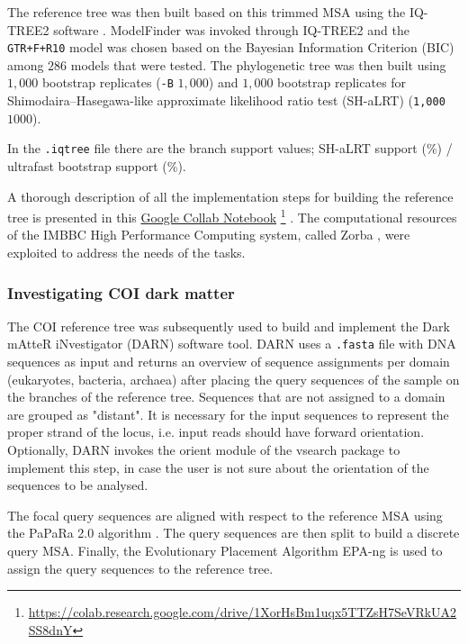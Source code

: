    The reference tree was then built based on this trimmed MSA using the IQ-TREE2 software \citep{hoang2018ufboot2, minh2020iq}.
   ModelFinder was invoked through IQ-TREE2 and the \texttt{GTR+F+R10} model was chosen based on the 
   Bayesian Information Criterion (BIC) among $286$ models that were tested. 
   The phylogenetic tree was then built using $1,000$ bootstrap replicates (\texttt{-B} $1,000$) and 
   $1,000$ bootstrap replicates for Shimodaira–Hasegawa-like approximate likelihood ratio test (SH-aLRT) (\texttt{1,000} $1000$).
   
   In the \texttt{.iqtree} file there are the branch support values; SH-aLRT support (\%) / ultrafast bootstrap support (\%).
   
   A thorough description of all the implementation steps for building the reference tree is presented in this 
   \href{https://colab.research.google.com/drive/1XorHsBm1uqx5TTZsH7SeVRkUA2SS8dnY}{Google Collab Notebook} 
   \footnote{
      \href{https://colab.research.google.com/drive/1XorHsBm1uqx5TTZsH7SeVRkUA2SS8dnY}{https://colab.research.google.com/drive/1XorHsBm1uqx5TTZsH7SeVRkUA2SS8dnY}
   }
   . 
   The computational resources of the IMBBC High Performance Computing system, called Zorba \citep{zafeiropoulos20210s}, were exploited to address the needs of the tasks.


   \subsubsection*{Investigating COI dark matter}
   \label{subsec:darn-methods-investigate}

   The COI reference tree was subsequently used to build and implement the Dark mAtteR iNvestigator (DARN) software tool. 
   DARN uses a \texttt{.fasta} file with DNA sequences as input and returns an overview of sequence assignments per domain (eukaryotes, bacteria, archaea) after placing the query sequences of the sample on the branches of the reference tree. 
   Sequences that are not assigned to a domain are grouped as "distant". 
   It is necessary for the input sequences to represent the proper strand of the locus, 
   i.e. input reads should have forward orientation. 
   Optionally, DARN invokes the orient module of the vsearch package \citep{rognes2016vsearch} to implement this step, in case the user is not sure about the orientation of the sequences to be analysed.

   The focal query sequences are aligned with respect to the reference MSA using the PaPaRa 2.0 algorithm \citep{berger2012papara}. 
   The query sequences are then split to build a discrete query MSA. 
   Finally, the Evolutionary Placement Algorithm EPA-ng \citep{barbera2019epa} is used to assign the query sequences to the reference tree.

